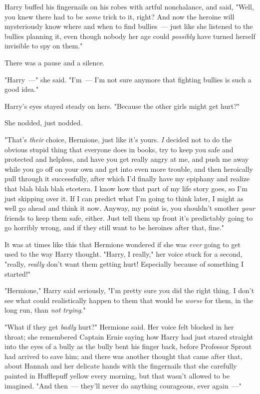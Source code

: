 Harry buffed his fingernails on his robes with artful nonchalance, and said,
"Well, you knew there had to be \emph{some} trick to it, right? And now the
heroine will mysteriously know where and when to find bullies~--- just like she
listened to the bullies planning it, even though nobody her age could
\emph{possibly} have turned herself invisible to spy on them."

There was a pause and a silence.

"Harry~---" she said. "I'm~--- I'm not sure anymore that fighting bullies is such
a good idea."

Harry's eyes stayed steady on hers. "Because the other girls might get hurt?"

She nodded, just nodded.

"That's \emph{their} choice, Hermione, just like it's yours. \emph{I} decided
not to do the obvious stupid thing that everyone does in books, try to keep you
safe and protected and helpless, and have you get really angry at me, and push
me away while you go off on your own and get into even more trouble, and then
heroically pull through it successfully, after which I'd finally have my
epiphany and realize that blah blah blah etcetera. I know how that part of my
life story goes, so I'm just skipping over it. If I can predict what I'm going
to think later, I might as well go ahead and think it now. Anyway, my point is,
you shouldn't smother \emph{your} friends to keep them safe, either. Just tell
them up front it's predictably going to go horribly wrong, and if they still
want to be heroines after that, fine."

It was at times like this that Hermione wondered if she was \emph{ever} going
to get used to the way Harry thought. "Harry, I really," her voice stuck for a
second, "really, \emph{really} don't want them getting hurt! Especially because
of something I started!"

"Hermione," Harry said seriously, "I'm pretty sure you did the right thing. I
don't see what could realistically happen to them that would be \emph{worse}
for them, in the long run, than \emph{not trying}."

"What if they get \emph{badly} hurt?" Hermione said. Her voice felt blocked in
her throat; she remembered Captain Ernie saying how Harry had just stared
straight into the eyes of a bully as the bully bent his finger back, before
Professor Sprout had arrived to save him; and there was another thought that
came after that, about Hannah and her delicate hands with the fingernails that
she carefully painted in Hufflepuff yellow every morning, but that wasn't
allowed to be imagined. "And then~--- they'll never do anything courageous, ever
again~---"

